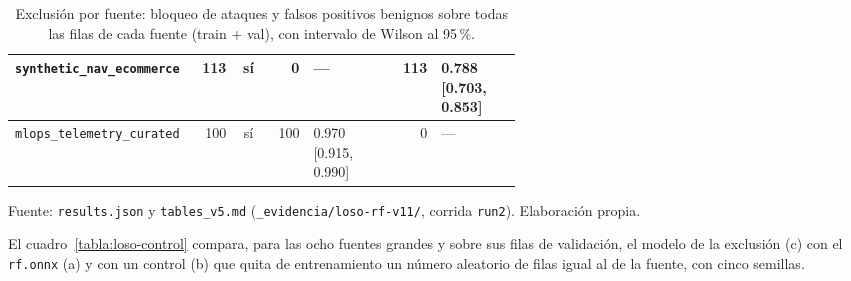 \begin{table}[htbp]
\begin{tabular}{|p{0.27\linewidth}|r|c|r|p{0.16\linewidth}|r|p{0.16\linewidth}|}
\texttt{synthetic\_\allowbreak{}nav\_\allowbreak{}ecommerce} & 113 & sí & 0 & — & 113 & 0.788 [0.703, 0.853] \\ \hline
\texttt{mlops\_\allowbreak{}telemetry\_\allowbreak{}curated} & 100 & sí & 100 & 0.970 [0.915, 0.990] & 0 & — \\ \hline
\end{tabular}
\caption{Exclusión por fuente: bloqueo de ataques y falsos positivos benignos sobre todas las filas de cada fuente (train + val), con intervalo de Wilson al 95\,\%.}
\label{tabla:loso-fuentes}
\par\smallskip\footnotesize Fuente: \texttt{results.json} y \texttt{tables\_\allowbreak{}v5.md} (\texttt{\_\allowbreak{}evidencia/loso-rf-v11/}, corrida \texttt{run2}). Elaboración propia.
\end{table}

El cuadro~\ref{tabla:loso-control} compara, para las ocho fuentes grandes y sobre sus filas de validación, el modelo de la exclusión (c) con el \texttt{rf.onnx} (a) y con un control (b) que quita de entrenamiento un número aleatorio de filas igual al de la fuente, con cinco semillas.

